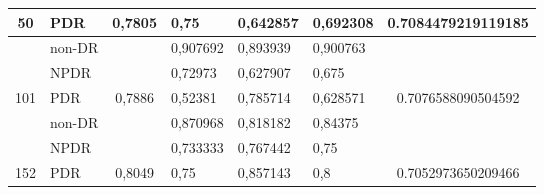 \begin{table}[hbtp]
\begin{center}
\begin{tabular}{|c|l|c|l|l|l|c|}
            \multirow{-3}{*}{50}  & PDR                                                & \multirow{-3}{*}{0,7805} & 0,75     & 0,642857 & 0,692308 & \multirow{-3}{*}{0.7084479219119185} \\ \hline
                                  & non-DR                                             &                          & 0,907692 & 0,893939 & 0,900763 &                                      \\ \cline{2-2} \cline{4-6}
                                  & NPDR                                               &                          & 0,72973  & 0,627907 & 0,675    &                                      \\ \cline{2-2} \cline{4-6}
            \multirow{-3}{*}{101} & PDR                                                & \multirow{-3}{*}{0,7886} & 0,52381  & 0,785714 & 0,628571 & \multirow{-3}{*}{0.7076588090504592} \\ \hline
                                  & non-DR                                             &                          & 0,870968 & 0,818182 & 0,84375  &                                      \\ \cline{2-2} \cline{4-6}
                                  & NPDR                                               &                          & 0,733333 & 0,767442 & 0,75     &                                      \\ \cline{2-2} \cline{4-6}
            \multirow{-3}{*}{152} & PDR                                                & \multirow{-3}{*}{0,8049} & 0,75     & 0,857143 & 0,8      & \multirow{-3}{*}{0.7052973650209466} \\ \hline
            \end{tabular}
        \end{center}
    \end{table}
